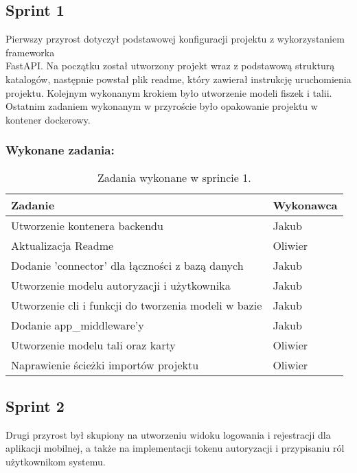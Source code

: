 \subsection{Sprint 1}

Pierwszy przyrost dotyczył podstawowej konfiguracji projektu z wykorzystaniem frameworka \\{FastAPI}. Na początku został utworzony projekt wraz z podstawową strukturą katalogów, następnie powstał plik readme, który zawierał instrukcję uruchomienia projektu. Kolejnym wykonanym krokiem było utworzenie modeli fiszek i talii. Ostatnim zadaniem wykonanym w przyroście było opakowanie projektu w kontener dockerowy.

\subsubsection{Wykonane zadania:}

\begin{table}[H]
\centering
\begin{tabularx}{\textwidth}{|p{}|X|}
    \hline
    \textbf{Zadanie} & \textbf{Wykonawca} \\
    \hline
    Utworzenie kontenera backendu & Jakub \\
    \hline
    Aktualizacja Readme & Oliwier \\
    \hline
    [BACKEND] Dodanie 'connector' dla łączności z bazą danych & Jakub \\
    \hline
    [BACKEND] Utworzenie modelu autoryzacji i użytkownika & Jakub \\
    \hline
    [BACKEND] Utworzenie cli i funkcji do tworzenia modeli w bazie & Jakub \\
    \hline
    [BACKEND] Dodanie app\_middleware'y & Jakub \\
    \hline
    [BACKEND] Utworzenie modelu tali oraz karty & Oliwier \\
    \hline
    [BACKEND] Naprawienie ścieżki importów projektu & Oliwier \\
    \hline
\end{tabularx}
        \caption{Zadania wykonane w sprincie 1.}
\end{table}

\subsection{Sprint 2}

Drugi przyrost był skupiony na utworzeniu widoku logowania i rejestracji dla aplikacji
mobilnej, a także na implementacji tokenu autoryzacji i przypisaniu ról użytkownikom systemu.

